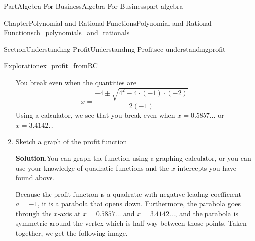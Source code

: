 \documentclass[oneside,10pt,]{tufte-book}
\newcommand{\blocktitlefont}{\relax}
\numberwithin{equation}{chapter}
\begin{document}
\begin{partptx}{Part}{Algebra For Business}{}{Algebra For Business}{}{}{part-algebra}
\begin{chapterptx}{Chapter}{Polynomial and Rational Functions}{}{Polynomial and Rational Functions}{}{}{ch_polynomials_and_rationals}
\begin{sectionptx}{Section}{Understanding Profit}{}{Understanding Profit}{}{}{sec-understandingprofit}
\begin{exploration}{Exploration}{}{ex_profit_fromRC}
\begin{enumerate}[font=\bfseries,label=(\alph*),ref=\alph*]
\par
You break even when the quantities are%
\begin{equation*}
x = \dfrac{-4 \pm \sqrt{4^2 - 4\cdot (-1)\cdot (-2)} }{2(-1)}
\end{equation*}
Using a calculator, we see that you break even when \(x=0.5857\dots\) or \(x=3.4142\dots\)%
\item{}Sketch a graph of the profit function%
\par\smallskip%
\noindent\textbf{\blocktitlefont Solution}.\hypertarget{ex_profit_fromRC-4-2}{}\quad{}You can graph the function using a graphing calculator, or you can use your knowledge of quadratic functions and the \(x\)-intercepts you have found above.%
\par
Because the profit function is a quadratic with negative  leading coefficient \(a=-1\), it is a parabola that opens down. Furthermore, the parabola goes through the \(x\)-axis at \(x=0.5857\dots\) and \(x=3.4142\dots\), and the parabola is symmetric around the vertex which is half way between those points. Taken together, we get the following image.%
\begin{image}{0.25}{0.5}{0.25}{}%
\end{image}
\end{enumerate}
\end{exploration}
\end{sectionptx}
\end{chapterptx}
\end{partptx}
\end{document}
